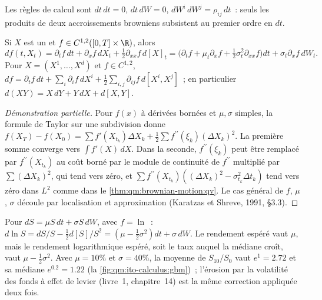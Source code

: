 Les règles de calcul sont $dt\,dt = 0$, $dt\,dW = 0$, $dW^i\,dW^j = \rho_{ij}\,dt$~: seuls les produits de
deux accroissements browniens subsistent au premier ordre en $dt$.

\begin{theorem}\label{thm:qm:ito-calculus:ito}
Si $X$ est un  et $f \in C^{1,2}([0,T]\times\R)$, alors
\[
df(t, X_t) = \partial_tf\,dt + \partial_xf\,dX_t + \tfrac12\partial_{xx}f\,d[X]_t
= \bigl(\partial_tf + \mu_t\partial_xf + \tfrac12\sigma_t^2\partial_{xx}f\bigr)dt + \sigma_t\partial_xf\,dW_t.
\]
Pour $X = (X^1, \dots, X^d)$ et $f \in C^{1,2}$, $df = \partial_tf\,dt + \sum_i\partial_if\,dX^i +
\tfrac12\sum_{i,j}\partial_{ij}f\,d[X^i, X^j]$~; en particulier $d(XY) = X\,dY + Y\,dX + d[X, Y]$.
\end{theorem}

\begin{proof}[Démonstration partielle]
Pour $f(x)$ à dérivées bornées et $\mu, \sigma$ simples, la formule de Taylor sur une subdivision donne
$f(X_T) - f(X_0) = \sum f'(X_{t_k})\Delta X_k + \tfrac12\sum f^{\prime\prime}(\xi_k)(\Delta X_k)^2$. La première somme
converge vers $\int f'(X)\,dX$. Dans la seconde, $f^{\prime\prime}(\xi_k)$ peut être remplacé par $f^{\prime\prime}(X_{t_k})$ au
coût borné par le module de continuité de $f^{\prime\prime}$ multiplié par $\sum(\Delta X_k)^2$, qui tend vers zéro,
et $\sum f^{\prime\prime}(X_{t_k})((\Delta X_k)^2 - \sigma_{t_k}^2\Delta t_k)$ tend vers zéro dans $L^2$ comme dans
le \cref{thm:qm:brownian-motion:qv}. Le cas général de $f$, $\mu$, $\sigma$ découle par localisation et
approximation (Karatzas et Shreve, 1991, §3.3).
\end{proof}

\begin{example}\label{ex:qm:ito-calculus:log}
Pour $dS = \mu S\,dt + \sigma S\,dW$, avec $f = \ln$~: $d\ln S = dS/S - \tfrac12 d[S]/S^2 = (\mu -
\tfrac12\sigma^2)dt + \sigma\,dW$. Le rendement espéré vaut $\mu$, mais le rendement logarithmique espéré, soit le taux
auquel la médiane croît, vaut $\mu - \tfrac12\sigma^2$. Avec $\mu = 10\%$ et $\sigma = 40\%$, la
moyenne de $S_{10}/S_0$ vaut $e^{1} = 2.72$ et sa médiane $e^{0.2} = 1.22$
(la \cref{fig:qm:ito-calculus:gbm})~; l'érosion par la volatilité des fonds à effet de levier (livre~1,
chapitre~14) est la même correction appliquée deux fois.
\end{example}

